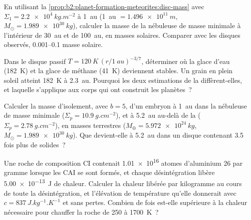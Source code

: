 \begin{exercise}[$\star\star$]\label{exo:b2:planet-formation-meteorites:5}
En utilisant la \cref{prop:b2:planet-formation-meteorites:disc-mass} avec
$\Sigma_1 = \qty{2.2e4}{kg.m^{-2}}$ à \qty{1}{au} (\qty{1}{au} $=
\qty{1.496e11}{m}$, $M_\odot = \qty{1.989e30}{kg}$), calculer la masse de la
nébuleuse de masse minimale à l'intérieur de \qty{30}{au} et de \qty{100}{au}, en
masses solaires. Comparer avec les disques observés, \numrange{0.001}{0.1} masse solaire.
\end{exercise}

\begin{exercise}[$\star\star$]\label{exo:b2:planet-formation-meteorites:6}
Dans le disque passif $T = \qty{120}{K}\,(r/\qty{1}{au})^{-3/7}$, déterminer où la glace d'eau
(\qty{182}{K}) et la glace de méthane (\qty{41}{K}) deviennent stables. Un grain en plein soleil atteint
\qty{182}{K} à \qty{2.3}{au}. Pourquoi les deux estimations de la  diffèrent-elles, et
laquelle s'applique aux corps qui ont construit les planètes~?
\end{exercise}

\begin{exercise}[$\star\star$]\label{exo:b2:planet-formation-meteorites:7}
Calculer la masse d'isolement, avec $b = 5$, d'un embryon à \qty{1}{au} dans la nébuleuse de masse
minimale ($\Sigma_p = \qty{10.9}{g.cm^{-2}}$), et à \qty{5.2}{au} au-delà de la 
($\Sigma_p = \qty{2.78}{g.cm^{-2}}$), en masses terrestres ($M_\oplus = \qty{5.972e24}{kg}$,
$M_\odot = \qty{1.989e30}{kg}$). Que devient-elle à \qty{5.2}{au} dans un disque contenant \num{3.5}
fois plus de solides~?
\end{exercise}

\begin{exercise}[$\star\star$]\label{exo:b2:planet-formation-meteorites:8}
Une roche de composition CI contenait \num{1.01e16} atomes d'aluminium 26 par gramme
lorsque les CAI se sont formés, et chaque désintégration libère \qty{5.00e-13}{J} de
chaleur. Calculer la chaleur libérée par kilogramme au cours de toute la désintégration, et
l'élévation de température qu'elle donnerait avec $c = \qty{837}{J.kg^{-1}.K^{-1}}$ et sans
pertes. Combien de fois est-elle supérieure à la chaleur nécessaire pour chauffer la roche
de \num{250} à \qty{1700}{K}~?
\end{exercise}


